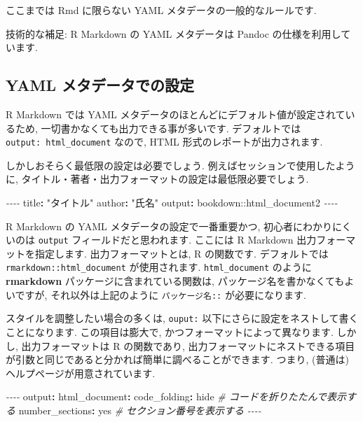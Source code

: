 \documentclass[
]{ltjsarticle}
\newenvironment{Shaded}{\begin{snugshade}}{\end{snugshade}}
\newcommand{\AttributeTok}[1]{\textcolor[rgb]{0.77,0.63,0.00}{#1}}
\newcommand{\CharTok}[1]{\textcolor[rgb]{0.31,0.60,0.02}{#1}}
\newcommand{\CommentTok}[1]{\textcolor[rgb]{0.56,0.35,0.01}{\textit{#1}}}
\newcommand{\FunctionTok}[1]{\textcolor[rgb]{0.00,0.00,0.00}{#1}}
\newcommand{\KeywordTok}[1]{\textcolor[rgb]{0.13,0.29,0.53}{\textbf{#1}}}
\newcommand{\PreprocessorTok}[1]{\textcolor[rgb]{0.56,0.35,0.01}{\textit{#1}}}
\newcommand{\StringTok}[1]{\textcolor[rgb]{0.31,0.60,0.02}{#1}}
\begin{document}
ここまでは Rmd に限らない YAML メタデータの一般的なルールです.

技術的な補足: R Markdown の YAML メタデータは Pandoc の仕様を利用しています.

\hypertarget{yaml-ux30e1ux30bfux30c7ux30fcux30bfux3067ux306eux8a2dux5b9a}{%
\subsection{YAML メタデータでの設定}\label{yaml-ux30e1ux30bfux30c7ux30fcux30bfux3067ux306eux8a2dux5b9a}}

R Markdown では YAML メタデータのほとんどにデフォルト値が設定されているため, 一切書かなくても出力できる事が多いです. デフォルトでは \texttt{output:\ html\_document} なので, HTML 形式のレポートが出力されます.

しかしおそらく最低限の設定は必要でしょう. 例えばセッションで使用したように, タイトル・著者・出力フォーマットの設定は最低限必要でしょう.

\begin{Shaded}
\begin{Highlighting}[]
\PreprocessorTok{{-}{-}{-}{-}}
\FunctionTok{title}\KeywordTok{:}\AttributeTok{ }\StringTok{"タイトル"}
\FunctionTok{author}\KeywordTok{:}\AttributeTok{ }\StringTok{"氏名"}
\FunctionTok{output}\KeywordTok{:}\AttributeTok{ bookdown::html\_document2}
\PreprocessorTok{{-}{-}{-}{-}}
\end{Highlighting}
\end{Shaded}

R Markdown の YAML メタデータの設定で一番重要かつ, 初心者にわかりにくいのは \texttt{output} フィールドだと思われます. ここには R Markdown 出力フォーマットを指定します. 出力フォーマットとは, R の関数です. デフォルトでは \texttt{rmarkdown::html\_document} が使用されます. \texttt{html\_document} のように \textbf{rmarkdown} パッケージに含まれている関数は, パッケージ名を書かなくてもよいですが, それ以外は上記のように \texttt{パッケージ名::} が必要になります.

スタイルを調整したい場合の多くは, \texttt{ouput:} 以下にさらに設定をネストして書くことになります. この項目は膨大で, かつフォーマットによって異なります. しかし, 出力フォーマットは R の関数であり, 出力フォーマットにネストできる項目が引数と同じであると分かれば簡単に調べることができます. つまり, (普通は) ヘルプページが用意されています.

\begin{Shaded}
\begin{Highlighting}[]
\PreprocessorTok{{-}{-}{-}{-}}
\FunctionTok{output}\KeywordTok{:}
\AttributeTok{  }\FunctionTok{html\_document}\KeywordTok{:}
\AttributeTok{    }\FunctionTok{code\_folding}\KeywordTok{:}\AttributeTok{ hide}\CommentTok{  \# コードを折りたたんで表示する}
\AttributeTok{    }\FunctionTok{number\_sections}\KeywordTok{:}\AttributeTok{ }\CharTok{yes}\CommentTok{  \# セクション番号を表示する}
\PreprocessorTok{{-}{-}{-}{-}}
\end{Highlighting}
\end{Shaded}
\end{document}

